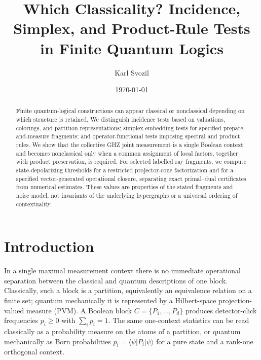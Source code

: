\documentclass[aps,pra,twocolumn,superscriptaddress,nofootinbib]{revtex4-2}
\begin{document}
\title{Which Classicality? Incidence, Simplex, and Product-Rule Tests in Finite Quantum Logics}

\author{Karl Svozil }

\date{\today}

\begin{abstract}
Finite quantum-logical constructions can appear classical or nonclassical
depending on which structure is retained.  We distinguish incidence tests based
on valuations, colorings, and partition representations; simplex-embedding
tests for specified prepare-and-measure fragments; and operator-functional
tests imposing spectral and product rules.  We show that the collective GHZ
joint measurement is a single Boolean context and becomes nonclassical only
when a common assignment of local factors, together with product preservation,
is required.  For selected labelled ray fragments, we compute
state-depolarizing thresholds for a restricted projector-cone factorization
and for a specified vector-generated operational closure, separating exact
primal--dual certificates from numerical estimates.  These values are
properties of the stated fragments and noise model, not invariants of the
underlying hypergraphs or a universal ordering of contextuality.
\end{abstract}

\maketitle


\section{Introduction}

In a single maximal measurement context there is no immediate operational
separation between the classical and quantum descriptions of one block.
Classically, such a block is a partition, equivalently an equivalence relation
on a finite set; quantum mechanically it is represented by a Hilbert-space
projection-valued measure (PVM).  A Boolean block \(C=\{P_1,\ldots,P_d\}\)
produces detector-click frequencies \(p_i\geq0\) with \(\sum_i p_i=1\).  The
same one-context statistics can be read classically as a probability measure on
the atoms of a partition, or quantum mechanically as Born probabilities
\(p_i=\langle\psi|P_i|\psi\rangle\) for a pure state and a rank-one orthogonal
context.
\end{document}
